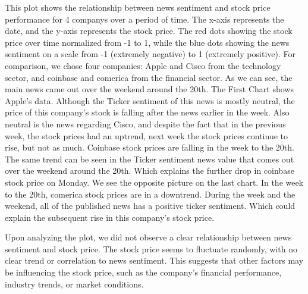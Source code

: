 This plot shows the relationship between news sentiment and stock price performance for 4 companys over a period of time. The x-axis represents the date, and the y-axis represents the stock price. The red dots showing the stock price over time normalized from -1 to 1, while the blue dots showing the news sentiment on a scale from -1 (extremely negative) to 1 (extremely positive). For comparison, we chose four companies: Apple and Cisco from the technology sector, and coinbase and comerica from the financial sector. As we can see, the main news came out over the weekend around the 20th. The First Chart shows Apple's data.  Although the Ticker sentiment of this news is mostly neutral, the price of this company's stock is falling after the news earlier in the week.  Also neutral is the news regarding Cisco, and despite the fact that in the previous week, the stock prices had an uptrend, next week the stock prices continue to rise, but not as much.  Coinbase stock prices are falling in the week to the 20th.  The same trend can be seen in the Ticker sentiment news value that comes out over the weekend around the 20th.  Which explains the further drop in coinbase stock price on Monday.   We see the opposite picture on the last chart.   In the week to the 20th, comerica stock prices are in a downtrend.  During the week and the weekend, all of the published news has a positive ticker sentiment.  Which could explain the subsequent rise in this company's stock price.


Upon analyzing the plot, we did not observe a clear relationship between news sentiment and stock price. The stock price seems to fluctuate randomly, with no clear trend or correlation to news sentiment. This suggests that other factors may be influencing the stock price, such as the company's financial performance, industry trends, or market conditions.


